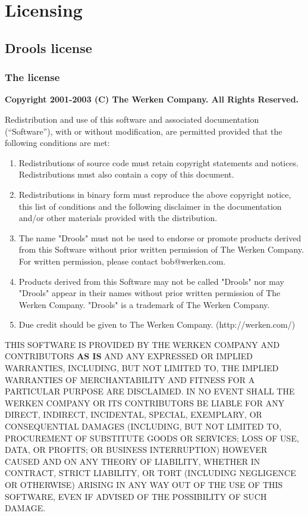 \chapter{Licensing}

\section{Drools license}

\subsection{The license}

{
\footnotesize

\textbf{Copyright 2001-2003 (C) The Werken Company. All Rights Reserved.}

\bigskip
 
\noindent
 Redistribution and use of this software and associated documentation
 (``Software''), with or without modification, are permitted provided
 that the following conditions are met:

\begin{enumerate}
 \item Redistributions of source code must retain copyright
    statements and notices.  Redistributions must also contain a
    copy of this document.
 
 \item Redistributions in binary form must reproduce the
    above copyright notice, this list of conditions and the
    following disclaimer in the documentation and/or other
    materials provided with the distribution.
 
 \item The name "Drools" must not be used to endorse or promote
    products derived from this Software without prior written
    permission of The Werken Company.  For written permission,
    please contact bob@werken.com.
 
 \item Products derived from this Software may not be called "Drools"
    nor may "Drools" appear in their names without prior written
    permission of The Werken Company. "Drools" is a trademark of 
    The Werken Company.
 
 \item Due credit should be given to The Werken Company.
    (http://werken.com/)
\end{enumerate}
 
\noindent
 THIS SOFTWARE IS PROVIDED BY THE WERKEN COMPANY AND CONTRIBUTORS
 \textbf{AS IS} AND ANY EXPRESSED OR IMPLIED WARRANTIES, INCLUDING, BUT
 NOT LIMITED TO, THE IMPLIED WARRANTIES OF MERCHANTABILITY AND
 FITNESS FOR A PARTICULAR PURPOSE ARE DISCLAIMED.  IN NO EVENT SHALL
 THE WERKEN COMPANY OR ITS CONTRIBUTORS BE LIABLE FOR ANY DIRECT,
 INDIRECT, INCIDENTAL, SPECIAL, EXEMPLARY, OR CONSEQUENTIAL DAMAGES
 (INCLUDING, BUT NOT LIMITED TO, PROCUREMENT OF SUBSTITUTE GOODS OR
 SERVICES; LOSS OF USE, DATA, OR PROFITS; OR BUSINESS INTERRUPTION)
 HOWEVER CAUSED AND ON ANY THEORY OF LIABILITY, WHETHER IN CONTRACT,
 STRICT LIABILITY, OR TORT (INCLUDING NEGLIGENCE OR OTHERWISE)
 ARISING IN ANY WAY OUT OF THE USE OF THIS SOFTWARE, EVEN IF ADVISED
 OF THE POSSIBILITY OF SUCH DAMAGE.
}

